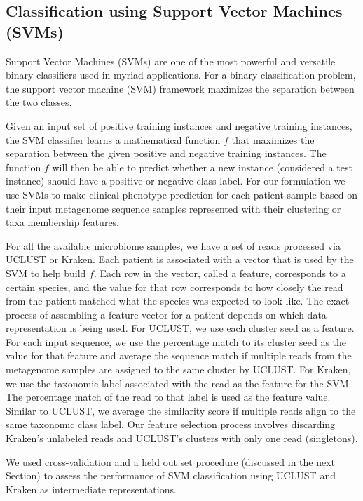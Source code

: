 \subsection{Classification using Support Vector Machines (SVMs)}

Support Vector Machines (SVMs) \cite{vap95} are 
one of the most powerful and versatile binary classifiers used 
in myriad applications. 
%
For a  binary classification problem, the support 
vector machine (SVM) \cite{vap95} framework 
maximizes the separation between the two classes.
%

Given an input set of positive training instances and 
negative training instances, the SVM classifier learns a 
mathematical function $f$  that maximizes the separation between 
the given positive and negative training instances. The function $f$ will then be able to predict whether a new instance (considered a test instance) should have a positive or negative class label.
%
For our formulation we use SVMs to make clinical phenotype prediction for each 
patient sample 
based on their  input metagenome sequence samples represented with their 
clustering or taxa membership features. 

For all the available microbiome samples,  we have a set of reads processed via UCLUST or Kraken. 
%
Each patient is associated with a vector that is used by the SVM to help build $f$. Each row in the vector, called a feature, corresponds to a certain species, and the value for that row corresponds to how closely the read from the patient matched what the species was expected to look like. The exact process of assembling a feature vector for a 
patient depends on which data representation is being used. For 
UCLUST, we use each cluster seed 
as a feature. For each input 
sequence, we use the percentage match to its cluster seed as 
the value for that feature and average the 
sequence match if multiple reads from the metagenome samples 
are assigned to the same cluster by UCLUST. 
%
For Kraken, we use the taxonomic label associated 
with the read as the feature for the SVM. The percentage match of the 
read to that label is used as the feature value. Similar 
to UCLUST, we average the similarity score if multiple reads align to the 
same taxonomic class label. 
%
Our feature selection process involves discarding Kraken's unlabeled 
reads and UCLUST's clusters with only one read (singletons). 

We used cross-validation and a held out set procedure (discussed in the next 
Section) to assess the performance of SVM classification using UCLUST and Kraken
as intermediate representations.


